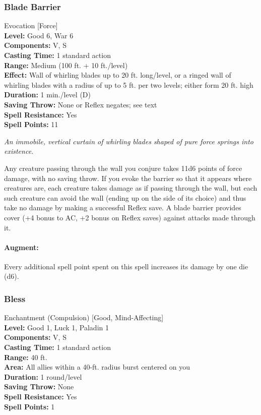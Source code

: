 \subsubsection{Blade Barrier}
\label{Spell:BladeBarrier}
Evocation [Force]
\\ \textbf{Level:} Good 6, War 6
\\ \textbf{Components:} V, S
\\ \textbf{Casting Time:} 1 standard action
\\ \textbf{Range:} Medium (100 ft. + 10 ft./level)
\\ \textbf{Effect:} Wall of whirling blades up to 20 ft. long/level, or a ringed wall of whirling blades with a radius of up to 5 ft. per two levels; either form 20 ft. high
\\ \textbf{Duration:} 1 min./level (D)
\\ \textbf{Saving Throw:} None or Reflex negates; see text
\\ \textbf{Spell Resistance:} Yes
\\ \textbf{Spell Points:} 11

\emph{An immobile, vertical curtain of whirling blades shaped of pure force springs into existence.}

Any creature passing through the wall you conjure takes 11d6 points of force damage, with no saving throw.
If you evoke the barrier so that it appears where creatures are, 
each creature takes damage as if passing through the wall, but each such creature can avoid the wall
(ending up on the side of its choice) and thus take no damage by making a successful Reflex save.
A blade barrier provides cover (+4 bonus to AC, +2 bonus on Reflex saves) against attacks made through it.

\paragraph{Augment:} Every additional spell point spent on this spell increases its damage by one die (d6).

\subsubsection{Bless}
\label{Spell:Bless}
Enchantment (Compulsion) [Good, Mind-Affecting]
\\ \textbf{Level:} Good 1, Luck 1, Paladin 1
\\ \textbf{Components:} V, S
\\ \textbf{Casting Time:} 1 standard action
\\ \textbf{Range:} 40 ft.
\\ \textbf{Area:} All allies within a 40-ft. radius burst centered on you
\\ \textbf{Duration:} 1 round/level
\\ \textbf{Saving Throw:} None
\\ \textbf{Spell Resistance:} Yes
\\ \textbf{Spell Points:} 1

